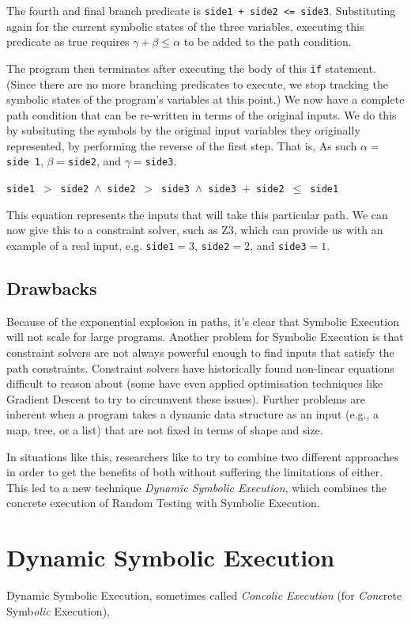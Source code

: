 The fourth and final branch predicate is {\tt side1 + side2 <= side3}.
Substituting again for the current symbolic states of the three variables, 
executing this predicate as true requires $\gamma + \beta \leq \alpha$ to be
added to the path condition. 

The program then terminates after executing the body of this {\tt if} statement.
(Since there are no more branching predicates to execute, we stop tracking the
symbolic states of the program's variables at this point.) We now have a
complete path condition that can be re-written in terms of the original inputs.
We do this by subsituting the symbols by the original input variables they
originally represented, by performing the reverse of the first step. That is, As
such $\alpha = ${\tt side 1}, $\beta = ${\tt side2}, and $\gamma = ${\tt side3}.

\begin{center}
{\tt side1}~$ > $~{\tt side2}~$ \wedge $~{\tt side2}~$ > $~{\tt side3}~$ \wedge
$~{\tt side3}~$ + $~{\tt side2}~$ \leq $~{\tt side1}
\end{center}

This equation represents the inputs that will take this particular path. We can
now give this to a constraint solver, such as Z3, which can provide us with an
example of a real input, e.g. {\tt side1}$ =
3$, {\tt side2}$ = 2$, and {\tt side3}$ = 1$.

\subsection{Drawbacks}

Because of the exponential explosion in paths, it's clear that Symbolic
Execution will not scale for large programs. Another problem for Symbolic
Execution is that constraint solvers are not always powerful enough to find
inputs that satisfy the path constraints. Constraint solvers have historically
found non-linear equations difficult to reason about (some have even applied
optimisation techniques like Gradient Descent to try to circumvent these
issues). Further problems are inherent when a program takes a dynamic data
structure as an input (e.g., a map, tree, or a list) that are not fixed in terms
of shape and size. 

In situations like this, researchers like to try to combine two different
approaches in order to get the benefits of both without suffering the
limitations of either. This led to a new technique {\it Dynamic Symbolic
Execution}, which combines the concrete execution of Random Testing with
Symbolic Execution.

\section{Dynamic Symbolic Execution}

Dynamic Symbolic Execution, sometimes called {\it Concolic Execution} (for {\it
Conc}rete Symb{\it olic} Execution),

